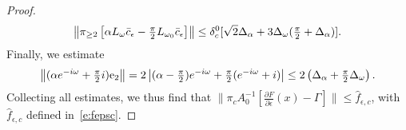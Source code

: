 \begin{proof}
	\begin{equation*}
	\left\|	\pi_{\geq 2}	\left[\alpha L_{\omega} \bar{c}_{\epsilon} - \tfrac{\pi}{2} L_{\omega_0} \bar{c}_{\epsilon} \right] \right\| \leq 
	\delta_c^0  [ \sqrt{2} \Delta_\alpha + 3 \Delta_\omega (\tfrac{\pi}{2}+\Delta_\alpha) ] .
	\end{equation*}
Finally, we estimate 
	\begin{equation*}
	\left\| ( \alpha e^{-i\omega}  + \tfrac{\pi}{2} i) \mathrm{e}_2 \right\| = 
	2 \left| ( \alpha - \tfrac{\pi}{2}) e^{-i \omega} + \tfrac{\pi}{2} ( e^{-i \omega} +i) \right|
	\leq 2 \left( \Delta_\alpha + \tfrac{\pi}{2} \Delta_\omega \right).
	\end{equation*}
Collecting all estimates, we thus find that
	$ \| \pi_c A_{0}^{-1}  [  \tfrac{\partial F}{\partial  \epsilon} (x) -\Gamma ] \|   \leq \hat{f}_{\epsilon,c} $, with $\hat{f}_{\epsilon,c}$ defined in~\eqref{e:fepsc}.
\end{proof}

